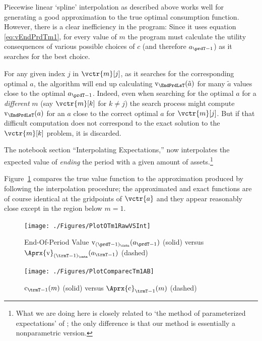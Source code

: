 \documentclass[titlepage, headings=optiontotocandhead]{econtex}
\begin{document}
Piecewise linear `spline' interpolation as described above works well for generating a good approximation to the true optimal consumption function. However, there is a clear inefficiency in the program: Since it uses equation \eqref{eq:vEndPrdTm1}, for every value of $m$ the program must calculate the utility consequences of various possible choices of $c$ (and therefore $a_{\prdT-1}$) as it searches for the best choice.

For any given index $j$ in $\vctr{m}[j]$, as it searches for the corresponding optimal $a$, the algorithm will end up  calculating $\mathrm{v}_{\EndPrdLsT}(\tilde{a})$ for many $\tilde{a}$ values close to the optimal $a_{\prdT-1}$.  Indeed, even when searching for the optimal $a$ for a \emph{different} $m$ (say $\vctr{m}[k]$ for $k \neq j$) the search process might compute $\mathrm{v}_{\EndPrdLsT}(a)$ for an $a$ close to the correct optimal $a$ for $\vctr{m}[j]$. But if that difficult computation does not correspond to the exact solution to the $\vctr{m}[k]$ problem, it is discarded.  


The notebook section ``Interpolating Expectations,'' now interpolates the expected value of \textit{ending} the period with a given amount of assets.\footnote{What we are doing here is closely related to `the method of parameterized expectations' of \cite{denHaanMarcet:parameterized}; the only difference is that our method is essentially a nonparametric version.}  %

Figure~\ref{fig:PlotOTm1RawVSInt} compares the true value function to the approximation produced by following the interpolation procedure; the approximated and exact functions are of course identical at the gridpoints of $\vctr{a}$ and they appear reasonably close except in the region below $m=1$.

\hypertarget{PlotOTm1RawVSInt}{}
\begin{figure}
  \centerline{\texttt{[image: ./Figures/PlotOTm1RawVSInt]}}
  \caption{End-Of-Period Value $\mathrm{v}_{(\prdT-1)_\cntn}(a_{\prdT-1})$ (solid) versus $\Aprx{\mathrm{v}}_{({\trmT-1})_\cntn}(a_{\trmT-1})$ (dashed)}
  \label{fig:PlotOTm1RawVSInt}
\end{figure}

\hypertarget{PlotComparecTm1AB}{}
\begin{figure}
  \centerline{\texttt{[image: ./Figures/PlotComparecTm1AB]}}
  \caption{$\mathrm{c}_{\trmT-1}(m)$ (solid) versus $\Aprx{\mathrm{c}}_{\trmT-1}(m)$ (dashed)}
  \label{fig:PlotComparecTm1AB}
\end{figure}
\end{document}

